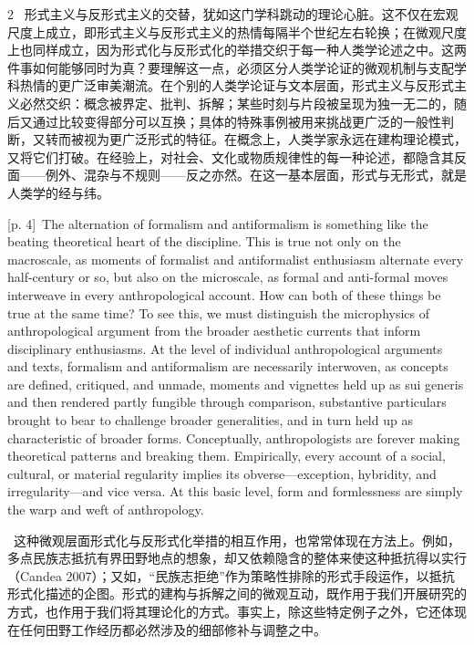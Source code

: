 \documentclass[10pt,a4paper]{article}
\begin{document}
\begin{paracol}{2}
\switchcolumn*
{\scriptsize\color{gray} [p. 4]}\ 形式主义与反形式主义的交替，犹如这门学科跳动的理论心脏。这不仅在宏观尺度上成立，即形式主义与反形式主义的热情每隔半个世纪左右轮换；在微观尺度上也同样成立，因为形式化与反形式化的举措交织于每一种人类学论述之中。这两件事如何能够同时为真？要理解这一点，必须区分人类学论证的微观机制与支配学科热情的更广泛审美潮流。在个别的人类学论证与文本层面，形式主义与反形式主义必然交织：概念被界定、批判、拆解；某些时刻与片段被呈现为独一无二的，随后又通过比较变得部分可以互换；具体的特殊事例被用来挑战更广泛的一般性判断，又转而被视为更广泛形式的特征。在概念上，人类学家永远在建构理论模式，又将它们打破。在经验上，对社会、文化或物质规律性的每一种论述，都隐含其反面——例外、混杂与不规则——反之亦然。在这一基本层面，形式与无形式，就是人类学的经与纬。\par
\switchcolumn
{\scriptsize\color{gray} [p. 4]}\ The alternation of formalism and antiformalism is something like the beating theoretical heart of the discipline. This is true not only on the macroscale, as moments of formalist and antiformalist enthusiasm alternate every half-century or so, but also on the microscale, as formal and anti-formal moves interweave in every anthropological account. How can both of these things be true at the same time? To see this, we must distinguish the microphysics of anthropological argument from the broader aesthetic currents that inform disciplinary enthusiasms. At the level of individual anthropological arguments and texts, formalism and antiformalism are necessarily interwoven, as concepts are defined, critiqued, and unmade, moments and vignettes held up as sui generis and then rendered partly fungible through comparison, substantive particulars brought to bear to challenge broader generalities, and in turn held up as characteristic of broader forms. Conceptually, anthropologists are forever making theoretical patterns and breaking them. Empirically, every account of a social, cultural, or material regularity implies its obverse—exception, hybridity, and irregularity—and vice versa. At this basic level, form and formlessness are simply the warp and weft of anthropology.\par
\switchcolumn*
{\scriptsize\color{gray} [p. 5]}\ 这种微观层面形式化与反形式化举措的相互作用，也常常体现在方法上。例如，多点民族志抵抗有界田野地点的想象，却又依赖隐含的整体来使这种抵抗得以实行（Candea 2007）；又如，“民族志拒绝”作为策略性排除的形式手段运作，以抵抗形式化描述的企图。形式的建构与拆解之间的微观互动，既作用于我们开展研究的方式，也作用于我们将其理论化的方式。事实上，除这些特定例子之外，它还体现在任何田野工作经历都必然涉及的细部修补与调整之中。\par

\end{paracol}
\end{document}
